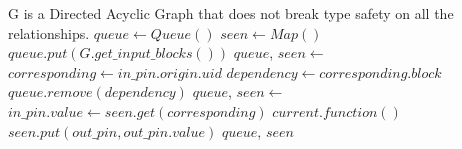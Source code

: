 \documentclass[12pt, varwidth=20cm]{standalone}
\begin{document}
  \begin{algorithmic}[1]
    \Require G is a Directed Acyclic Graph that does not break
    type safety on all the relationships.
      \State $queue \gets Queue()$
      \State $seen \gets Map()$
      \State $queue.put(G.get\_input\_blocks())$ 
        \State $queue$, $seen \gets$ 
      \EndWhile
    \EndFunction
    \\
        \State $corresponding \gets in\_pin.origin.uid$
          \State $dependency \gets corresponding.block$
           
            \State $queue.remove(dependency)$
          \EndIf
          \State $queue$, $seen \gets$ 
        \EndIf
        \State $in\_pin.value \gets seen.get(corresponding)$
      \EndFor
      \State $current.function()$ 
        \State $seen.put(out\_pin, out\_pin.value)$
      \EndFor
      \State \Return $queue$, $seen$
    \EndFunction
  \end{algorithmic}
\end{document}
